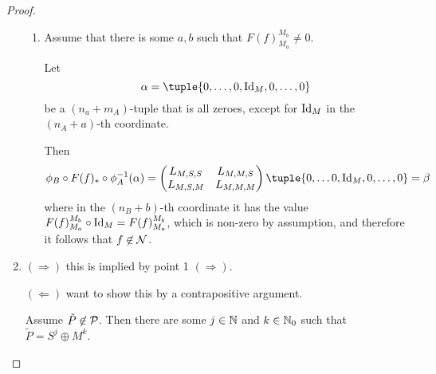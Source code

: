 \begin{proof}
\begin{enumerate}
{\begin{enumerate}
{                    Then
                    \[
                        \phi_B \circ F(f)_* \circ \phi_A^{-1} (\alpha) =
                        \begin{pmatrix}
                            L_{M, S, S} & L_{M, M, S} \\
                            L_{M, S, M} & L_{M, M, M}
                        \end{pmatrix}
                        \tuple{ 0, \dots 0, \Id_M, 0, \dots, 0 }
                        = \beta
                    \]
                    where in the \( b \)-th coordinate it has the value \( F(f)_{M_a}^{S_b} \circ \Id_M = F(f)_{M_a}^{S_b} \), which is non-zero by assumption, and therefore it follows that \( f \not\in \Nc \).
                }
                \item {
                    Assume that there is some \( a, b \) such that \( F(f)_{M_a}^{M_b} \neq 0 \).

                    Let
                    \[
                        \alpha = \tuple{0, \dots, 0, \Id_M, 0, \dots, 0}
                    \]
                    be a \( ( n_a + m_A ) \)-tuple that is all zeroes, except for \( \operatorname{Id}_M \) in the \( ( n_A + a ) \)-th coordinate.

                    Then
                    \[
                        \phi_B \circ F(f)_* \circ \phi_A^{-1} (\alpha) =
                        \begin{pmatrix}
                            L_{M, S, S} & L_{M, M, S} \\
                            L_{M, S, M} & L_{M, M, M}
                        \end{pmatrix}
                        \tuple{ 0, \dots 0, \Id_M, 0, \dots, 0 }
                        = \beta
                    \]
                    where in the \( ( n_B + b ) \)-th coordinate it has the value \( F(f)_{M_a}^{M_b} \circ \operatorname{Id}_M = F(f)_{M_a}^{M_b} \), which is non-zero by assumption, and therefore it follows that \( f \not\in \Nc \).
                }
            \end{enumerate}
        }
        \item {
            \( ( \Rightarrow ) \) this is implied by point 1 \( (\Rightarrow) \).

            \( ( \Leftarrow ) \) want to show this by a contrapositive argument.

            Assume \( \tilde{P} \not\in {\mathcal{P}} \). Then there are some \( j \in {\mathbb{N}} \) and \( k \in {\mathbb{N}}_0 \) such that \( \tilde{P} = S^j \oplus M^k \).

}
\end{enumerate}
\end{proof}
